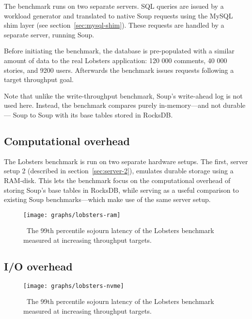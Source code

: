 
The benchmark runs on two separate servers. SQL queries are issued by a workload
generator and translated to native Soup requests using the MySQL shim layer (see
section~\ref{sec:mysql-shim}). These requests are handled by a separate server,
running Soup.

Before initiating the benchmark, the database is pre-populated with a similar
amount of data to the real Lobsters application: 120 000 comments, 40 000
stories, and 9200 users. Afterwards the benchmark issues requests following a
target throughput goal.

Note that unlike the write-throughput benchmark, Soup's write-ahead log is not
used here. Instead, the benchmark compares purely in-memory---and not durable---
Soup to Soup with its base tables stored in RocksDB.\@

\subsection{Computational overhead}

The Lobsters benchmark is run on two separate hardware setups. The first, server
setup 2 (described in section~\ref{sec:server-2}), emulates durable storage
using a
RAM-disk.
This lets the benchmark focus on the computational overhead of storing Soup's
base tables in RocksDB, while serving as a useful comparison to existing Soup
benchmarks---which make use of the same server setup.

\begin{figure}[H]
  \centering
  \texttt{[image: graphs/lobsters-ram]}
  \caption{\
    The 99th percentile sojourn latency of the Lobsters benchmark measured at
    increasing throughput targets.
  }\label{fig:lobsters-ram}
\end{figure}

\subsection{I/O overhead}

\begin{figure}[H]
  \centering
  \texttt{[image: graphs/lobsters-nvme]}
  \caption{\
    The 99th percentile sojourn latency of the Lobsters benchmark measured at
    increasing throughput targets.
  }\label{fig:lobsters-nvme}
\end{figure}


